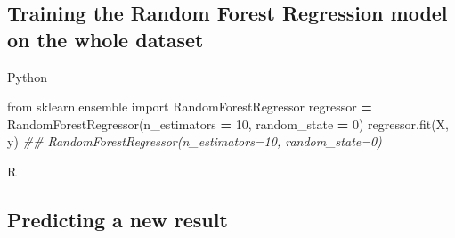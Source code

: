 \documentclass[
]{book}
\newenvironment{Shaded}{\begin{snugshade}}{\end{snugshade}}
\newcommand{\AttributeTok}[1]{\textcolor[rgb]{0.77,0.63,0.00}{#1}}
\newcommand{\CommentTok}[1]{\textcolor[rgb]{0.56,0.35,0.01}{\textit{#1}}}
\newcommand{\DecValTok}[1]{\textcolor[rgb]{0.00,0.00,0.81}{#1}}
\newcommand{\DocumentationTok}[1]{\textcolor[rgb]{0.56,0.35,0.01}{\textbf{\textit{#1}}}}
\newcommand{\FunctionTok}[1]{\textcolor[rgb]{0.00,0.00,0.00}{#1}}
\newcommand{\ImportTok}[1]{#1}
\newcommand{\NormalTok}[1]{#1}
\newcommand{\OperatorTok}[1]{\textcolor[rgb]{0.81,0.36,0.00}{\textbf{#1}}}
\newcommand{\OtherTok}[1]{\textcolor[rgb]{0.56,0.35,0.01}{#1}}
\newcommand{\SpecialCharTok}[1]{\textcolor[rgb]{0.00,0.00,0.00}{#1}}
\theoremstyle{definition}
\theoremstyle{definition}
\theoremstyle{definition}
\theoremstyle{definition}
\theoremstyle{remark}
\begin{document}
\hypertarget{training-the-random-forest-regression-model-on-the-whole-dataset}{%
\subsection{Training the Random Forest Regression model on the whole dataset}\label{training-the-random-forest-regression-model-on-the-whole-dataset}}

Python

\begin{Shaded}
\begin{Highlighting}[]
\ImportTok{from}\NormalTok{ sklearn.ensemble }\ImportTok{import}\NormalTok{ RandomForestRegressor}
\NormalTok{regressor }\OperatorTok{=}\NormalTok{ RandomForestRegressor(n\_estimators }\OperatorTok{=} \DecValTok{10}\NormalTok{, random\_state }\OperatorTok{=} \DecValTok{0}\NormalTok{)}
\NormalTok{regressor.fit(X, y)}
\CommentTok{\#\# RandomForestRegressor(n\_estimators=10, random\_state=0)}
\end{Highlighting}
\end{Shaded}

R

\begin{Shaded}
\end{Shaded}

\hypertarget{predicting-a-new-result-2}{%
\subsection{Predicting a new result}\label{predicting-a-new-result-2}}
\end{document}
